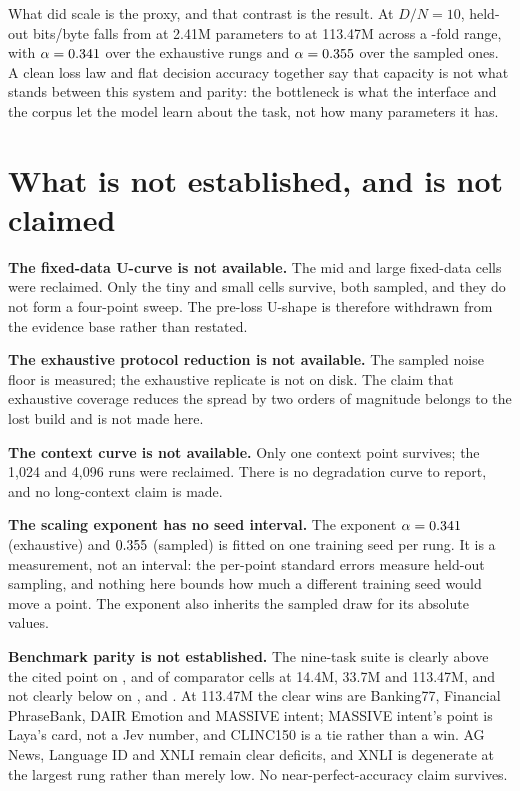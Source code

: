 What did scale is the proxy, and that contrast is the result. At $D/N = 10$,
held-out bits/byte falls from \IsoTinyExh{} at 2.41M parameters to \IsoLargeBpb{}
at 113.47M across a \IsoRange-fold range, with $\alpha = 0.341$ over the
\AlphaPoints{} exhaustive rungs and $\alpha = 0.355$ over the
\AlphaPointsSampled{} sampled ones. A clean loss law and flat decision accuracy
together say that capacity is not what stands between this system and parity:
the bottleneck is what the interface and the corpus let the model learn about
the task, not how many parameters it has.


\section{What is not established, and is not claimed}

\textbf{The fixed-data U-curve is not available.} The mid and large fixed-data
cells were reclaimed. Only the tiny and small cells survive, both sampled, and
they do not form a four-point sweep. The pre-loss U-shape is therefore withdrawn
from the evidence base rather than restated.

\textbf{The exhaustive protocol reduction is not available.} The sampled noise
floor is measured; the exhaustive replicate is not on disk. The claim that
exhaustive coverage reduces the spread by two orders of magnitude belongs to the
lost build and is not made here.

\textbf{The context curve is not available.} Only one context point survives;
the 1{,}024 and 4{,}096 runs were reclaimed. There is no degradation curve to
report, and no long-context claim is made.

\textbf{The scaling exponent has no seed interval.} The exponent
$\alpha = 0.341$ (exhaustive) and $0.355$ (sampled) is fitted on
one training seed per rung. It is a measurement, not an interval: the per-point
standard errors measure held-out sampling, and nothing here bounds how much a
different training seed would move a point. The exponent also inherits the
sampled draw for its absolute values.

\textbf{Benchmark parity is not established.} The nine-task suite is clearly
above the cited point on \SuiteSmallClear, \SuiteMidClear{} and \SuiteLargeClear{}
of \SuiteComparatorCells{} comparator cells at 14.4M, 33.7M and 113.47M, and not
clearly below on \SuiteSmallAtOrAboveThree, \SuiteMidAtOrAboveThree{} and
\SuiteLargeAtOrAbove. At 113.47M the clear wins are Banking77, Financial
PhraseBank, DAIR Emotion and MASSIVE intent; MASSIVE intent's point is Laya's
card, not a Jev number, and CLINC150 is a tie rather than a win. AG News,
Language ID and XNLI remain clear deficits, and XNLI is degenerate at the largest
rung rather than merely low. No near-perfect-accuracy claim survives.


